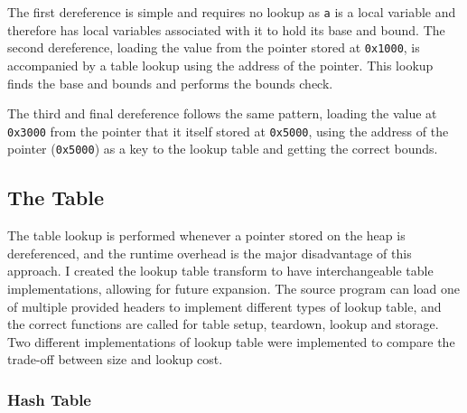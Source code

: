 The first dereference is simple and requires no lookup as \verb!a! is a local variable and therefore has local variables associated with it to hold its base and bound.
The second dereference, loading the value from the pointer stored at \verb!0x1000!, is accompanied by a table lookup using the address of the pointer.
This lookup finds the base and bounds and performs the bounds check.

The third and final dereference follows the same pattern, loading the value at \verb!0x3000! from the pointer that it itself stored at \verb!0x5000!, using the address of the pointer (\verb!0x5000!) as a key to the lookup table and getting the correct bounds.

\subsection{The Table}

The table lookup is performed whenever a pointer stored on the heap is dereferenced, and the runtime overhead is the major disadvantage of this approach.
I created the lookup table transform to have interchangeable table implementations, allowing for future expansion.
The source program can load one of multiple provided headers to implement different types of lookup table, and the correct functions are called for table setup, teardown, lookup and storage.
Two different implementations of lookup table were implemented to compare the trade-off between size and lookup cost.

%
%

\subsubsection{Hash Table}

